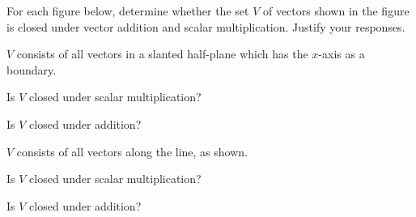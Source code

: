 \documentclass{ximera}
\begin{document}
\begin{problem} For each figure below, determine whether the set $V$ of vectors shown in the figure is closed under vector addition and scalar multiplication.  Justify your responses.
  
\begin{problem}\label{prob:closedmultchoice1} $V$ consists of all vectors in a slanted half-plane which has the $x$-axis as a boundary.


Is $V$ closed under scalar multiplication?
 
 \begin{multipleChoice}
 \end{multipleChoice}
 
 Is $V$ closed under addition?
 
 \begin{multipleChoice}
 \end{multipleChoice}
\end{problem}

\begin{problem} \label{prob:closedmultchoice2}
$V$ consists of all vectors along the line, as shown.

 
 Is $V$ closed under scalar multiplication?
 
 \begin{multipleChoice}
 \end{multipleChoice}
 
 Is $V$ closed under addition?
 
 \begin{multipleChoice}
 \end{multipleChoice}
\end{problem}    
\end{problem}
\end{document}
